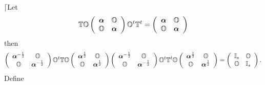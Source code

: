 \documentclass[aps,preprint]{revtex4}%
\begin{document}
$\lceil$Let%
\begin{equation}
\mathbb{TO}\left(
\begin{array}
[c]{cc}%
\boldsymbol{\alpha} & \mathbb{O}\\
\mathbb{O} & \boldsymbol{\alpha}%
\end{array}
\right)  \mathbb{O}^{t}\mathbb{T}^{t}=\left(
\begin{array}
[c]{cc}%
\boldsymbol{\alpha} & \mathbb{O}\\
\mathbb{O} & \boldsymbol{\alpha}%
\end{array}
\right)
\end{equation}
then
\begin{equation}
\left(
\begin{array}
[c]{cc}%
\boldsymbol{\alpha}^{-\frac{1}{2}} & \mathbb{O}\\
\mathbb{O} & \boldsymbol{\alpha}^{-\frac{1}{2}}%
\end{array}
\right)  \mathbb{O}^{t}\mathbb{TO}\left(
\begin{array}
[c]{cc}%
\boldsymbol{\alpha}^{\frac{1}{2}} & \mathbb{O}\\
\mathbb{O} & \boldsymbol{\alpha}^{\frac{1}{2}}%
\end{array}
\right)  \left(
\begin{array}
[c]{cc}%
\boldsymbol{\alpha}^{-\frac{1}{2}} & \mathbb{O}\\
\mathbb{O} & \boldsymbol{\alpha}^{-\frac{1}{2}}%
\end{array}
\right)  \mathbb{O}^{t}\mathbb{T}^{t}\mathbb{O}\left(
\begin{array}
[c]{cc}%
\boldsymbol{\alpha}^{\frac{1}{2}} & \mathbb{O}\\
\mathbb{O} & \boldsymbol{\alpha}^{\frac{1}{2}}%
\end{array}
\right)  =\left(
\begin{array}
[c]{cc}%
\mathbb{I}_{s} & \mathbb{O}\\
\mathbb{O} & \mathbb{I}_{s}%
\end{array}
\right)  .
\end{equation}
Define
\end{document}

